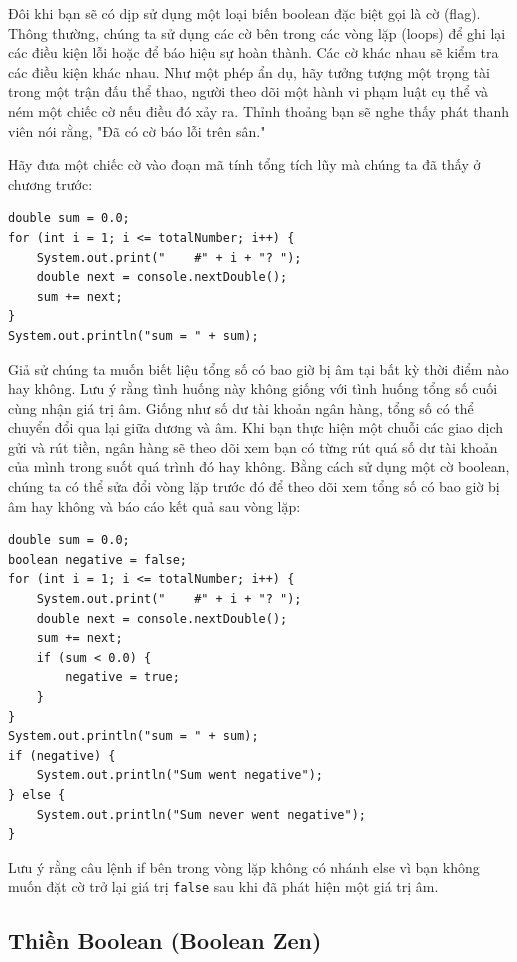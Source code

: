 Đôi khi bạn sẽ có dịp sử dụng một loại biến boolean đặc biệt gọi là cờ (flag). Thông thường, chúng ta sử dụng các cờ bên trong các vòng lặp (loops) để ghi lại các điều kiện lỗi hoặc để báo hiệu sự hoàn thành. Các cờ khác nhau sẽ kiểm tra các điều kiện khác nhau. Như một phép ẩn dụ, hãy tưởng tượng một trọng tài trong một trận đấu thể thao, người theo dõi một hành vi phạm luật cụ thể và ném một chiếc cờ nếu điều đó xảy ra. Thỉnh thoảng bạn sẽ nghe thấy phát thanh viên nói rằng, "Đã có cờ báo lỗi trên sân."

Hãy đưa một chiếc cờ vào đoạn mã tính tổng tích lũy mà chúng ta đã thấy ở chương trước:

\begin{verbatim}
double sum = 0.0;
for (int i = 1; i <= totalNumber; i++) {
    System.out.print("    #" + i + "? ");
    double next = console.nextDouble();
    sum += next;
}
System.out.println("sum = " + sum);
\end{verbatim}

Giả sử chúng ta muốn biết liệu tổng số có bao giờ bị âm tại bất kỳ thời điểm nào hay không. Lưu ý rằng tình huống này không giống với tình huống tổng số cuối cùng nhận giá trị âm. Giống như số dư tài khoản ngân hàng, tổng số có thể chuyển đổi qua lại giữa dương và âm. Khi bạn thực hiện một chuỗi các giao dịch gửi và rút tiền, ngân hàng sẽ theo dõi xem bạn có từng rút quá số dư tài khoản của mình trong suốt quá trình đó hay không. Bằng cách sử dụng một cờ boolean, chúng ta có thể sửa đổi vòng lặp trước đó để theo dõi xem tổng số có bao giờ bị âm hay không và báo cáo kết quả sau vòng lặp:

\begin{verbatim}
double sum = 0.0;
boolean negative = false;
for (int i = 1; i <= totalNumber; i++) {
    System.out.print("    #" + i + "? ");
    double next = console.nextDouble();
    sum += next;
    if (sum < 0.0) {
        negative = true;
    }
}
System.out.println("sum = " + sum);
if (negative) {
    System.out.println("Sum went negative");
} else {
    System.out.println("Sum never went negative");
}
\end{verbatim}

Lưu ý rằng câu lệnh if bên trong vòng lặp không có nhánh else vì bạn không muốn đặt cờ trở lại giá trị \texttt{false} sau khi đã phát hiện một giá trị âm.

\subsection*{Thiền Boolean (Boolean Zen)}

